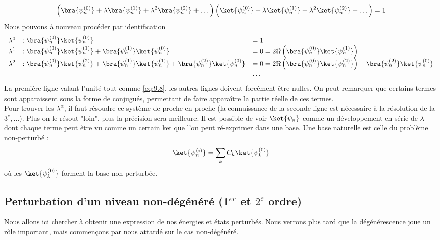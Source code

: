 	\begin{equation}
	\left(\bra{\psi_n^{(0)}}+\lambda\bra{\psi_n^{(1)}}+\lambda^2\bra{\psi_n^{(2)}}+\dots\right)
	\left(\ket{\psi_n^{(0)}}+\lambda\ket{\psi_n^{(1)}}+\lambda^2\ket{\psi_n^{(2)}}+\dots\right) = 1
	\label{eq:9.8}
	\end{equation}
	Nous pouvons à nouveau procéder par identification
	\begin{equation}
	\begin{array}{llll}
	\lambda^0 &: \bra{\psi_n^{(0)}}\ket{\psi_n^{(0)}} &=1\\
	\lambda^1 &: \bra{\psi_n^{(0)}}\ket{\psi_n^{(1)}} +\bra{\psi_n^{(1)}}\ket{\psi_n^{(0)}} &= 
	0 = 2\Re\left(\bra{\psi_n^{(0)}}\ket{\psi_n^{(1)}}\right)\\
	\lambda^2 &: \bra{\psi_n^{(0)}}\ket{\psi_n^{(2)}} +\bra{\psi_n^{(1)}}\ket{\psi_n^{(1)}}
	+\bra{\psi_n^{(2)}}\ket{\psi_n^{(0)}} &= 0 =2\Re\left(\bra{\psi_n^{(0)}}\ket{\psi_n^{(2)}}\right)		
	+\bra{\psi_n^{(2)}}\ket{\psi_n^{(0)}}\\
	&&\dots
	\end{array}
	\end{equation}
	La première ligne valant l'unité tout comme \eqref{eq:9.8}, les autres lignes doivent 
	forcément être nulles. On peut remarquer que certains termes sont apparaissent sous la 
	forme de conjugués, permettant de faire apparaître la partie réelle de ces termes.\\
	
	Pour trouver les $\lambda^\alpha$, il faut résoudre ce système de proche en proche (la 
	connaissance de la 	seconde ligne est nécessaire à la résolution de la $3^e, \dots$). Plus 
	on le résout "loin", plus la précision sera meilleure. Il est possible de voir $\ket{\psi_n}$
	comme un développement en série de $\lambda$ dont chaque terme peut être vu comme un 
	certain ket que l'on peut ré-exprimer dans une base. Une base naturelle est celle du 
	problème non-perturbé :
	\begin{equation}
	\ket{\psi_n^{(i)}} = \sum_k C_k\ket{\psi_k^{(0)}}
	\end{equation}
	où les $\ket{\psi_k^{(0)}}$ forment la base non-perturbée.
		
	\subsection{Perturbation d'un niveau non-dégénéré (1$^{er}$ et $2^e$ ordre)}
	Nous allons ici chercher à obtenir une expression de nos énergies et états perturbés. Nous 
	verrons plus tard que la dégénérescence joue un rôle important, mais commençons par nous 
	attardé sur le cas non-dégénéré.
		
